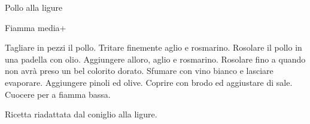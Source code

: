 \begin{recipe}{Pollo alla ligure}
    \begin{header}

           {Fiamma media+}
    \end{header}
    
    \begin{ingredients}
    \end{ingredients}
    
    \begin{preparation}
        \step Tagliare in pezzi il pollo.
        \step Tritare finemente aglio e rosmarino.
        \step Rosolare il pollo in una padella con olio.
        \step Aggiungere alloro, aglio e rosmarino.
        \step Rosolare fino a quando non avrà preso un bel colorito dorato.
        \step Sfumare con vino bianco e lasciare evaporare.
        \step Aggiungere pinoli ed olive.
        \step Coprire con brodo ed aggiustare di sale.
        \step Cuocere per  a fiamma bassa.
    \end{preparation}
    
    \begin{hint}
        Ricetta riadattata dal coniglio alla ligure.
    \end{hint}
\end{recipe}
